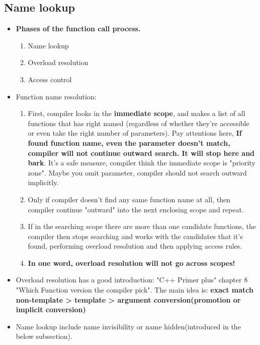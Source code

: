 \documentclass[a4paper,11pt,twoside]{book}
\begin{document}
\subsection{Name lookup}
\begin{itemize}
	
	\item \textbf{Phases of the function call process.}
	\begin{enumerate}
		\item Name lookup 
		\item Overload resolution 
		\item Access control
	\end{enumerate}
	
	\item Function name resolution:
	\begin{enumerate}
		\item First, compiler looks in the \textbf{immediate scope},  and makes a list of all functions that has right named  (regardless of whether they're accessible or even take the right number of parameters). Pay attentions here, \textbf{If found function name, even the parameter doesn't match, compiler will not continue outward search. It will stop here and bark}. It's a safe measure, compiler think the immediate scope is "priority zone". Maybe you omit parameter, compiler should not search outward implicitly. 
		
		\item Only if compiler doesn't find any same function name at all, then compiler continue "outward" into the next enclosing scope and repeat.
		
		\item If in the searching scope there are more than one candidate functions, the compiler then stops searching and works with the candidates that it's found, performing overload resolution and then applying access rules.
		
		\item \textbf{In one word, overload resolution will not go across scopes!}
	\end{enumerate}
	
	
	
	\item Overload resolution has a good introduction: "C++ Primer plus" chapter 8 "Which Function version the compiler pick". The main idea is: \textbf{exact match non-template > template > argument conversion(promotion or implicit conversion)}
	
	\item Name lookup include name invisibility or name hidden(introduced in the below subsection).
\end{itemize}
\end{document}
